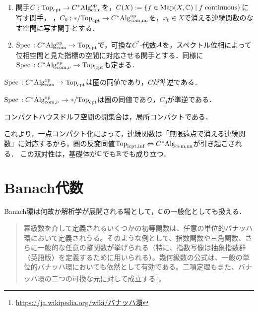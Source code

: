 \documentclass[uplatex,dvipdfmx]{jsreport}
\begin{document}
\begin{notation}[functors]\mbox{}
    \begin{enumerate}
        \item 関手$C:\mathrm{Top}_{\mathrm{cpt}}\to C^*\mathrm{Alg}^{\mathrm{op}}_{\mathrm{com}}$を，$C(X):=\left\{f\in\mathrm{Map}(X,\mathbb{C})\mid f\text{\;continuous}\right\}$に写す関手，
        ，$C_0:*/\mathrm{Top}_{\mathrm{cpt}}\to C^*\mathrm{Alg}^{\mathrm{op}}_{\mathrm{com},\mathrm{nu}}$を，$x_0\in X$で消える連続関数のなす空間に写す関手とする．
        \item $\mathrm{Spec}\,:C^*\mathrm{Alg}^{\mathrm{op}}_{\mathrm{com}}\to\mathrm{Top}_{\mathrm{cpt}}$で，可換な$C^*$-代数$\mathcal{A}$を，スペクトル位相によって位相空間と見た指標の空間に対応させる関手とする．同様に$\mathrm{Spec}\,:C^*\mathrm{Alg}^{\mathrm{op}}_{\mathrm{com},\nu}\to\mathrm{Top}_{\mathrm{lcpt}}$も定まる．
    \end{enumerate}
\end{notation}

\begin{theorem}\label{thm-Gelfand-duality-theorem}
    $\mathrm{Spec}\,:C^*\mathrm{Alg}^{\mathrm{op}}_{\mathrm{com}}\to\mathrm{Top}_{\mathrm{cpt}}$は圏の同値であり，$C$が準逆である．
\end{theorem}
\begin{corollary}
    $\mathrm{Spec}\,:C^*\mathrm{Alg}^{\mathrm{op}}_{\mathrm{com},\nu}\to */\mathrm{Top}_{\mathrm{cpt}}$は圏の同値であり，$C_0$が準逆である．
\end{corollary}

\begin{lemma}
    コンパクトハウスドルフ空間の開集合は，局所コンパクトである．
\end{lemma}
\begin{remarks}
    これより，一点コンパクト化によって，連続関数は「無限遠点で消える連続関数」に対応するから，圏の反変同値$\mathrm{Top}_{\mathrm{lcpt},\mathrm{inf}}\Leftrightarrow C^*\mathrm{Alg}_{\mathrm{com},\mathrm{nu}}$が引き起こされる．
    この双対性は，基礎体が$\mathbb{C}$でも$\mathbb{R}$でも成り立つ．
\end{remarks}

\section{Banach代数}

\begin{tcolorbox}[colframe=ForestGreen, colback=ForestGreen!10!white,breakable,colbacktitle=ForestGreen!40!white,coltitle=black,fonttitle=\bfseries\sffamily,
    title=]
    Banach環は何故か解析学が展開される場として，$\mathbb{C}$の一般化としても扱える．
    \begin{quote}
        冪級数を介して定義されるいくつかの初等関数は、任意の単位的バナッハ環において定義されうる。そのような例として、指数関数や三角関数、さらに一般的な任意の整関数が挙げられる（特に、指数写像は抽象指数群（英語版）を定義するために用いられる）。幾何級数の公式は、一般の単位的バナッハ環においても依然として有効である。二項定理もまた、バナッハ環の二つの可換な元に対して成立する\footnote{\url{https://ja.wikipedia.org/wiki/バナッハ環}}。
    \end{quote}
\end{tcolorbox}
\end{document}
